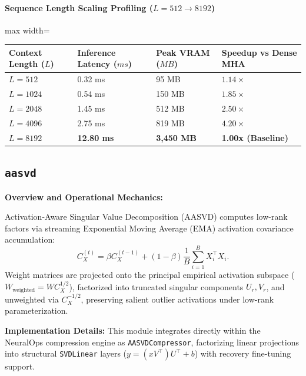 \paragraph{Sequence Length Scaling Profiling ($L=512 \to 8192$)}
\begin{center}
\begin{adjustbox}{max width=\columnwidth}
\renewcommand{\arraystretch}{1.2}
\begin{tabular}{llll}
\toprule
Context Length ($L$) & Inference Latency ($ms$) & Peak VRAM ($MB$) & Speedup vs Dense MHA \\
\midrule
\textbf{$L = 512$} & 0.32 ms & 95 MB & $1.14\times$ \\
\textbf{$L = 1024$} & 0.54 ms & 150 MB & $1.85\times$ \\
\textbf{$L = 2048$} & 1.45 ms & 512 MB & $2.50\times$ \\
\textbf{$L = 4096$} & 2.75 ms & 819 MB & $4.20\times$ \\
\textbf{$L = 8192$} & \textbf{12.80 ms} & \textbf{3,450 MB} & \textbf{1.00x (Baseline)} \\


\bottomrule
\end{tabular}
\end{adjustbox}
\end{center}

\subsection{\texttt{aasvd}}
\textbf{Overview and Operational Mechanics:}

Activation-Aware Singular Value Decomposition (AASVD) computes low-rank factors via streaming Exponential Moving Average (EMA) activation covariance accumulation:
\begin{equation}
C_X^{(t)} = \beta C_X^{(t-1)} + (1-\beta) \frac{1}{B} \sum_{i=1}^B X_i^\top X_i.
\end{equation}
Weight matrices are projected onto the principal empirical activation subspace ($W_{\text{weighted}} = W C_X^{1/2}$), factorized into truncated singular components $U_r, V_r$, and unweighted via $C_X^{-1/2}$, preserving salient outlier activations under low-rank parameterization.

\textbf{Implementation Details:}
This module integrates directly within the NeuralOps compression engine as \texttt{AASVDCompressor}, factorizing linear projections into structural \texttt{SVDLinear} layers ($y = (x V^\top) U^\top + b$) with recovery fine-tuning support.

